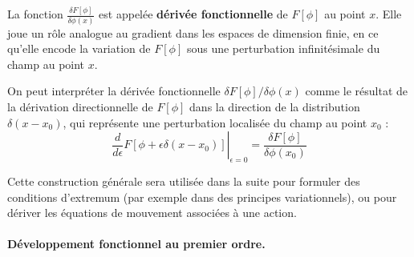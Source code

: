 \begin{mdframed}
La fonction $\frac{\delta F[\phi]}{\delta \phi(x)}$ est appelée \textbf{dérivée fonctionnelle} de $F[\phi]$ au point $x$. Elle joue un rôle analogue au gradient dans les espaces de dimension finie, en ce qu’elle encode la variation de $F[\phi]$ sous une perturbation infinitésimale du champ au point $x$.

On peut interpréter la dérivée fonctionnelle $\delta F[\phi]/\delta \phi(x)$ comme le résultat de la dérivation directionnelle de $F[\phi]$ dans la direction de la distribution $\delta(x - x_0)$, qui représente une perturbation localisée du champ au point $x_0$ :
\begin{equation}\label{chap2:eq.diff.q.3}
	\left. \frac{d}{d\epsilon} F[\phi + \epsilon \delta(x - x_0)] \right|_{\epsilon = 0} = \frac{\delta F[\phi]}{\delta \phi(x_0)}
\end{equation}

%
%
%

Cette construction générale sera utilisée dans la suite pour formuler des conditions d’extremum (par exemple dans des principes variationnels), ou pour dériver les équations de mouvement associées à une action.

\end{mdframed}


\paragraph{Développement fonctionnel au premier ordre.}


